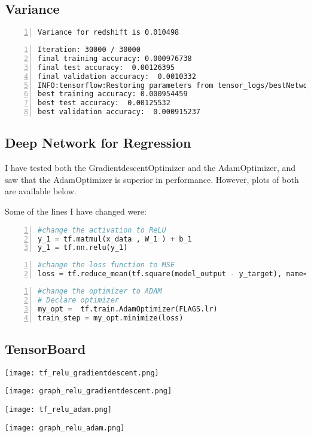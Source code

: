 \subsection{Variance}
\begin{lstlisting}[language={},numbers=left,numberstyle=\tiny,frame = single]
Variance for redshift is 0.010498
\end{lstlisting}

\begin{lstlisting}[language={},numbers=left,numberstyle=\tiny,frame=single,breaklines=true,postbreak=\mbox{\textcolor{red}{$\hookrightarrow$}\space}]
Iteration: 30000 / 30000
final training accuracy: 0.000976738
final test accuracy:  0.00126395 
final validation accuracy:  0.0010332
INFO:tensorflow:Restoring parameters from tensor_logs/bestNetwork
best training accuracy: 0.000954459 
best test accuracy:  0.00125532 
best validation accuracy:  0.000915237
\end{lstlisting}

\subsection{Deep Network for Regression}
I have tested both the GradientdescentOptimizer and the AdamOptimizer, and saw that the AdamOptimizer is superior in performance. However, plots of both are available below.

Some of the lines I have changed were:

\begin{lstlisting}[language=python,numbers=left,numberstyle=\tiny,frame=single,breaklines=true,postbreak=\mbox{\textcolor{red}{$\hookrightarrow$}\space}]
#change the activation to ReLU
y_1 = tf.matmul(x_data , W_1 ) + b_1
y_1 = tf.nn.relu(y_1)
\end{lstlisting}

\begin{lstlisting}[language=python,numbers=left,numberstyle=\tiny,frame=single,breaklines=true,postbreak=\mbox{\textcolor{red}{$\hookrightarrow$}\space}]
#change the loss function to MSE
loss = tf.reduce_mean(tf.square(model_output - y_target), name='mean_squared_error')
\end{lstlisting}

\begin{lstlisting}[language=python,numbers=left,numberstyle=\tiny,frame=single,breaklines=true,postbreak=\mbox{\textcolor{red}{$\hookrightarrow$}\space}]
#change the optimizer to ADAM
# Declare optimizer
my_opt =  tf.train.AdamOptimizer(FLAGS.lr)
train_step = my_opt.minimize(loss)
\end{lstlisting}

\subsection{TensorBoard}

\texttt{[image: tf\_relu\_gradientdescent.png]}

\texttt{[image: graph\_relu\_gradientdescent.png]}

\texttt{[image: tf\_relu\_adam.png]}

\texttt{[image: graph\_relu\_adam.png]}